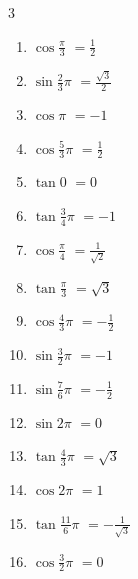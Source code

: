 \begin{multicols}{3}
\begin{enumerate}
  \item $\displaystyle \cos{\frac{\pi}{3}}$
        $\displaystyle =\frac{1}{2}$

  \item $\displaystyle \sin{\frac{2}{3}\pi}$
        $\displaystyle =\frac{\sqrt{3}}{2}$

\columnbreak %

\resetques

  \item $\displaystyle \cos{\pi}$
        $\displaystyle =-1$

  \item $\displaystyle \cos{\frac{5}{3}\pi}$
        $\displaystyle =\frac{1}{2}$

  \item $\displaystyle \tan{0}$
        $\displaystyle =0$

  \item $\displaystyle \tan{\frac{3}{4}\pi}$
        $\displaystyle =-1$

  \item $\displaystyle \cos{\frac{\pi}{4}}$
        $\displaystyle =\frac{1}{\sqrt{2}}$

  \item $\displaystyle \tan{\frac{\pi}{3}}$
        $\displaystyle =\sqrt{3}$

  \item $\displaystyle \cos{\frac{4}{3}\pi}$
        $\displaystyle =-\frac{1}{2}$

  \item $\displaystyle \sin{\frac{3}{2}\pi}$
        $\displaystyle =-1$

  \item $\displaystyle \sin{\frac{7}{6}\pi}$
        $\displaystyle =-\frac{1}{2}$

  \item $\displaystyle \sin{2\pi}$
        $\displaystyle =0$

  \item $\displaystyle \tan{\frac{4}{3}\pi}$
        $\displaystyle =\sqrt{3}$

  \item $\displaystyle \cos{2\pi}$
        $\displaystyle =1$

  \item $\displaystyle \tan{\frac{11}{6}\pi}$
        $\displaystyle =-\frac{1}{\sqrt{3}}$

  \item $\displaystyle \cos{\frac{3}{2}\pi}$
        $\displaystyle =0$


\end{enumerate}
\end{multicols}
